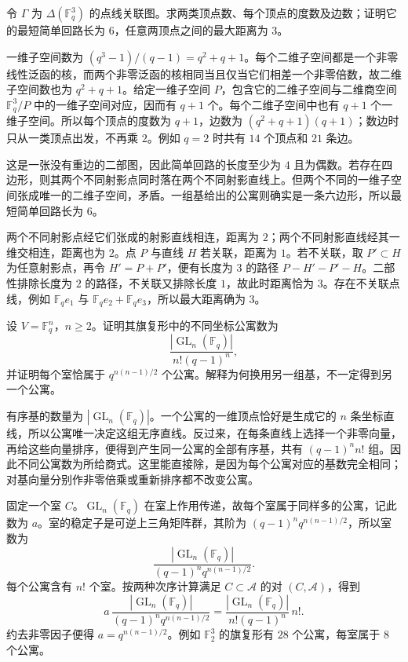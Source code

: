 \begin{exercise}\label{b5:ex:F-projective-plane-graph}
	令 \(\Gamma\) 为 \(\Delta(\mathbb F_q^3)\) 的点线关联图。求两类顶点数、每个顶点的度数及边数；证明它的最短简单回路长为 \(6\)，任意两顶点之间的最大距离为 \(3\)。
\end{exercise}
\begin{solution}
	一维子空间数为 \((q^3-1)/(q-1)=q^2+q+1\)。每个二维子空间都是一个非零线性泛函的核，而两个非零泛函的核相同当且仅当它们相差一个非零倍数，故二维子空间数也为 \(q^2+q+1\)。给定一维子空间 \(P\)，包含它的二维子空间与二维商空间 \(\mathbb F_q^3/P\) 中的一维子空间对应，因而有 \(q+1\) 个。每个二维子空间中也有 \(q+1\) 个一维子空间。所以每个顶点的度数为 \(q+1\)，边数为 \((q^2+q+1)(q+1)\)；数边时只从一类顶点出发，不再乘 \(2\)。例如 \(q=2\) 时共有 \(14\) 个顶点和 \(21\) 条边。

	这是一张没有重边的二部图，因此简单回路的长度至少为 \(4\) 且为偶数。若存在四边形，则其两个不同射影点同时落在两个不同射影直线上。但两个不同的一维子空间张成唯一的二维子空间，矛盾。一组基给出的公寓则确实是一条六边形，所以最短简单回路长为 \(6\)。

	两个不同射影点经它们张成的射影直线相连，距离为 \(2\)；两个不同射影直线经其一维交相连，距离也为 \(2\)。点 \(P\) 与直线 \(H\) 若关联，距离为 \(1\)。若不关联，取 \(P'\subset H\) 为任意射影点，再令 \(H'=P+P'\)，便有长度为 \(3\) 的路径 \(P-H'-P'-H\)。二部性排除长度为 \(2\) 的路径，不关联又排除长度 \(1\)，故此时距离恰为 \(3\)。存在不关联点线，例如 \(\mathbb F_q e_1\) 与 \(\mathbb F_q e_2+\mathbb F_q e_3\)，所以最大距离确为 \(3\)。
\end{solution}

\begin{exercise}\label{b5:ex:F-apartment-count}
	设 \(V=\mathbb F_q^n\)，\(n\ge2\)。证明其旗复形中的不同坐标公寓数为
	\[
		\frac{|\operatorname{GL}_n(\mathbb F_q)|}{n!(q-1)^n},
	\]
	并证明每个室恰属于 \(q^{n(n-1)/2}\) 个公寓。解释为何换用另一组基，不一定得到另一个公寓。
\end{exercise}
\begin{solution}
	有序基的数量为 \(|\operatorname{GL}_n(\mathbb F_q)|\)。一个公寓的一维顶点恰好是生成它的 \(n\) 条坐标直线，所以公寓唯一决定这组无序直线。反过来，在每条直线上选择一个非零向量，再给这些向量排序，便得到产生同一公寓的全部有序基，共有 \((q-1)^n n!\) 组。因此不同公寓数为所给商式。这里能直接除，是因为每个公寓对应的基数完全相同；对基向量分别作非零倍乘或重新排序都不改变公寓。

	固定一个室 \(C\)。\(\operatorname{GL}_n(\mathbb F_q)\) 在室上作用传递，故每个室属于同样多的公寓，记此数为 \(a\)。室的稳定子是可逆上三角矩阵群，其阶为 \((q-1)^nq^{n(n-1)/2}\)，所以室数为
	\[
		\frac{|\operatorname{GL}_n(\mathbb F_q)|}{(q-1)^nq^{n(n-1)/2}}.
	\]
	每个公寓含有 \(n!\) 个室。按两种次序计算满足 \(C\subset\mathcal A\) 的对 \((C,\mathcal A)\)，得到
	\[
		a\,\frac{|\operatorname{GL}_n(\mathbb F_q)|}{(q-1)^nq^{n(n-1)/2}}
		=\frac{|\operatorname{GL}_n(\mathbb F_q)|}{n!(q-1)^n}\,n!.
	\]
	约去非零因子便得 \(a=q^{n(n-1)/2}\)。例如 \(\mathbb F_2^3\) 的旗复形有 \(28\) 个公寓，每室属于 \(8\) 个公寓。
\end{solution}

